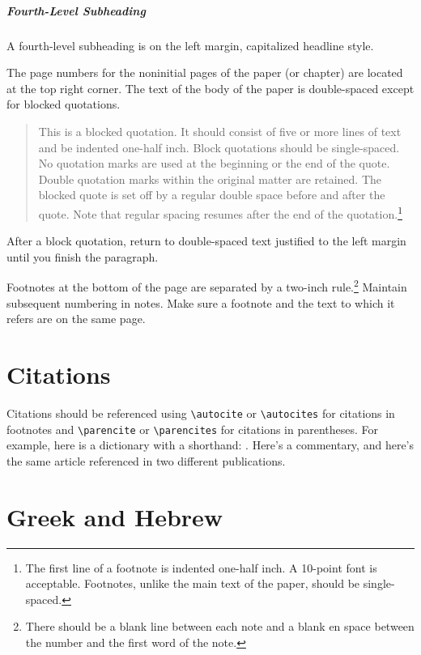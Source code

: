 \documentclass[letterpaper,12pt,oneside,openany]{book}
\begin{document}
\subparagraph{Fourth-Level Subheading}

A fourth-level subheading is on the left margin, capitalized headline style.

The page numbers for the noninitial pages of the paper (or chapter) are
located at the top right corner. The text of the body of the paper is
double-spaced except for blocked
quotations.
\begin{quote}
  This is a blocked quotation. It should consist of five or more lines of text
  and be indented one-half inch. Block quotations should be single-spaced. No
  quotation marks are used at the beginning or the end of the quote. Double
  quotation marks within the original matter are retained. The blocked quote
  is set off by a regular double space before and after the quote. Note that
  regular spacing resumes after the end of the quotation.\footnote{The first
  line of a footnote is indented one-half inch. A 10-point font is acceptable.
  Footnotes, unlike the main text of the paper, should be single-spaced.}
\end{quote}
After a block quotation, return to double-spaced text justified to the left
margin until you finish the paragraph.

%
Footnotes at the bottom of the page are separated by a two-inch
rule.\footnote{There should be a blank line between each note and a blank en
space between the number and the first word of the note.} Maintain subsequent
numbering in notes. Make sure a footnote and the text to which it refers are
on the same page.

\section{Citations}

%
Citations should be referenced using \verb+\autocite+ or \verb+\autocites+ for
citations in footnotes and \verb+\parencite+ or \verb+\parencites+ for
citations in parentheses. For example, here is a dictionary with a shorthand:
\parencite{NIDNTT}. Here's a commentary,\autocite{dahood:1965-1970} and here's
the same article referenced in two different
publications.\autocites{freedman:1977,freedman:1980}

\section{Greek
  \ifxetexorluatex
    and Hebrew%
  \fi}
\end{document}
